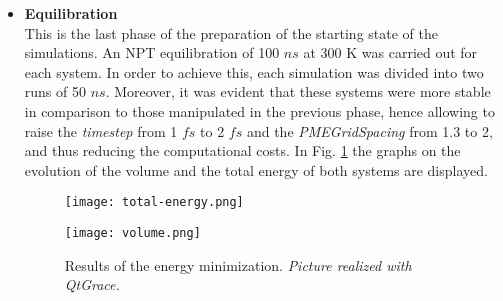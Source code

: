 \begin{itemize}
\item \textbf{Equilibration}\\
This is the last phase of the preparation of the starting state of the simulations. An NPT equilibration of 100 $ns$ at 300 K was carried out for each system. In order to achieve this, each simulation was divided into two runs of 50 $ns$. Moreover, it was evident that these systems were more stable in comparison to those manipulated in the previous phase, hence allowing to raise the \textit{timestep} from 1 $fs$ to 2 $fs$ and the \textit{PMEGridSpacing} from 1.3 to 2, and thus reducing the computational costs. In Fig. \ref{fig:trend-eq} the graphs on the evolution of the volume and the total energy of both systems are displayed.

\begin{figure}[H]
\centering
\begin{minipage}[t]{0.775\textwidth}
	\centering
    \texttt{[image: total-energy.png]}
    
    \texttt{[image: volume.png]}

    \footnotesize{\caption{Results of the energy minimization. \textit{Picture realized with QtGrace.}}
    \label{fig:trend-eq}
    }
\end{minipage} 
\end{figure}
\end{itemize}

